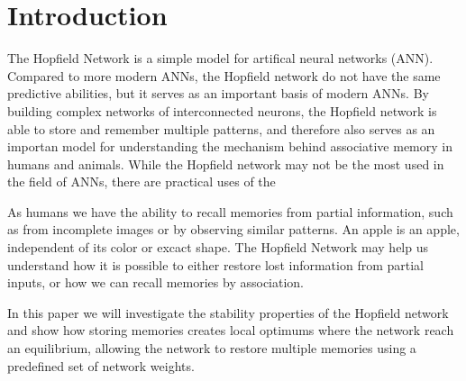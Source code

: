 \section{Introduction}
The Hopfield Network is a simple model for artifical neural networks (ANN). Compared to more modern ANNs, the Hopfield network do not have the same predictive abilities, but it serves as an important basis of modern ANNs. By building complex networks of interconnected neurons, the Hopfield network is able to store and remember multiple patterns, and therefore also serves as an importan model for understanding the mechanism behind associative memory in humans and animals. While the Hopfield network may not be the most used in the field of ANNs, there are practical uses of the 

As humans we have the ability to recall memories from partial information, such as from incomplete images or by observing similar patterns. An apple is an apple, independent of its color or excact shape. The Hopfield Network may help us understand how it is possible to either restore lost information from partial inputs, or how we can recall memories by association.

In this paper we will investigate the stability properties of the Hopfield network and show how storing memories creates local optimums where the network reach an equilibrium, allowing the network to restore multiple memories using a predefined set of network weights. 